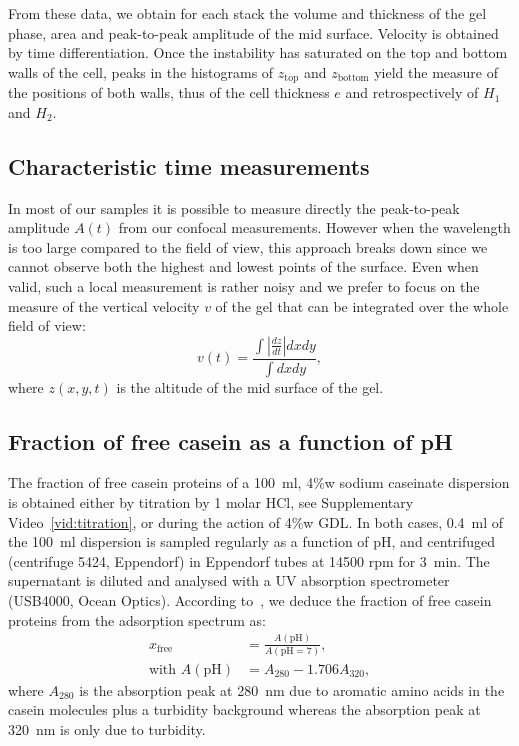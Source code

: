 \documentclass[twocolumn,superscriptaddress,showpacs,preprintnumbers,
amsmath,amssymb,prl]{revtex4-1}
\begin{document}
From these data, we obtain for each stack the volume and thickness of the gel phase, area and peak-to-peak amplitude of the mid surface. Velocity is obtained by time differentiation. Once the instability has saturated on the top and bottom walls of the cell, peaks in the histograms of $z_\text{top}$ and $z_\text{bottom}$ yield the measure of the positions of both walls, thus of the cell thickness $e$ and retrospectively of $H_1$ and $H_2$.

\subsection*{Characteristic time measurements}

In most of our samples it is possible to measure directly the peak-to-peak amplitude $A(t)$ from our confocal measurements. However when the wavelength is too large compared to the field of view, this approach breaks down since we cannot observe both the highest and lowest points of the surface. Even when valid, such a local measurement is rather noisy and we prefer to focus on the measure of the vertical velocity $v$ of the gel that can be integrated over the whole field of view:
\begin{equation}
v(t) = \frac{\int \left|\frac{dz}{dt}\right| dxdy}{\int dxdy},
\end{equation}
where $z(x,y,t)$ is the altitude of the mid surface of the gel.

\subsection*{Fraction of free casein as a function of pH}

The fraction of free casein proteins of a \SI{100}{\milli\litre}, 4\%w sodium caseinate dispersion is obtained either by titration by 1 molar HCl, see Supplementary Video~\ref{vid:titration}, or during the action of 4\%w GDL. In both cases, \SI{0.4}{\milli\litre} of the \SI{100}{\milli\litre} dispersion is sampled regularly as a function of pH, and centrifuged (centrifuge 5424, Eppendorf) in Eppendorf tubes at 14500 rpm for \SI{3}{\minute}. The supernatant is diluted and analysed with a UV absorption spectrometer (USB4000, Ocean Optics). According to~\cite{Roefs1986}, we deduce the fraction of free casein proteins from the adsorption spectrum as:
%
\begin{align}
x_\text{free} &= \frac{A(\text{pH})}{A(\text{pH}=7)},\\
\text{with }A(\text{pH}) &= A_{280}-1.706 A_{320},
\end{align}
%
where $A_{280}$ is the absorption peak at \SI{280}{\nano\metre} due to aromatic amino acids in the casein molecules plus a turbidity background whereas the absorption peak at \SI{320}{\nano\metre} is only due to turbidity. 
\end{document}

